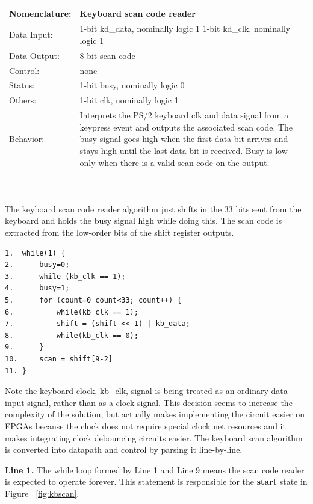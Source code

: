 \begin{tabular}{|l|p{3.5in}|} \hline
Nomenclature:  & Keyboard scan code reader		\\ \hline
Data Input:    & 1-bit kd\_data, nominally logic 1
		 1-bit kd\_clk, nominally logic 1	\\ \hline
Data Output:   & 8-bit scan code				\\ \hline
Control:       & none					\\ \hline
Status:        & 1-bit busy, nominally logic 0		\\ \hline
Others:        & 1-bit clk, nominally logic 1		\\ \hline
Behavior:      & Interprets the PS/2 keyboard clk and data signal
		from a keypress event and outputs the associated
		scan code.  The busy signal goes high when the
		first data bit arrives and stays high until the
		last data bit is received.  Busy is low only when
		there is a valid scan code on the output. \\ \hline
\end{tabular}
\\ \\
The keyboard scan code reader algorithm just shifts in the 33 bits
sent from the keyboard and holds the busy signal high while doing 
this.  The scan code is extracted from the low-order bits of the shift
register outputs.

\begin{verbatim}
1.  while(1) {
2.      busy=0;
3.      while (kb_clk == 1);
4.      busy=1;
5.      for (count=0 count<33; count++) {
6.          while(kb_clk == 1);
7.          shift = (shift << 1) | kb_data;
8.          while(kb_clk == 0);
9.      } 
10.     scan = shift[9-2]
11. } 
\end{verbatim}

Note the keyboard clock, kb\_clk, signal is being treated as an ordinary 
data input signal, rather than as a clock signal.  This decision seems to 
increase the complexity of the solution, but actually makes implementing 
the circuit easier on FPGAs because the clock does not require special 
clock net resources and it makes integrating
clock debouncing circuits easier.  The keyboard scan algorithm is converted
into datapath and control by parsing it line-by-line.

{\bf Line 1.} The while loop formed by Line 1 and Line 9 means the scan code reader 
is expected to operate forever.	This statement is responsible for the 
{\bf start} state in Figure ~\ref{fig:kbscan}.

